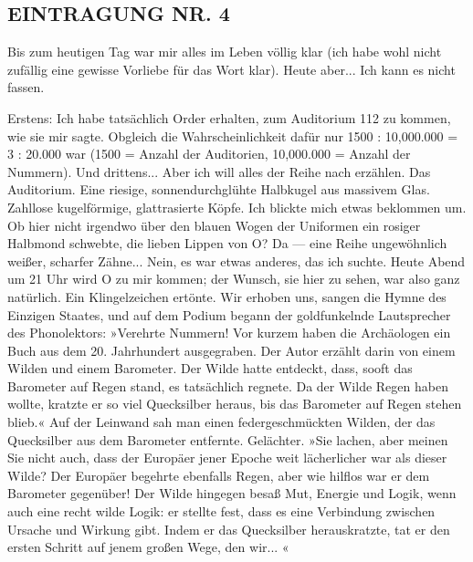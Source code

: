 \subsection{EINTRAGUNG NR. 4}

Bis zum heutigen Tag war mir alles im Leben völlig klar (ich habe
wohl nicht zufällig eine gewisse Vorliebe für das Wort klar). Heute
aber... Ich kann es nicht fassen.

Erstens: Ich habe tatsächlich Order erhalten, zum Auditorium 112 zu
kommen, wie sie mir sagte. Obgleich die Wahrscheinlichkeit dafür
nur 1500 : 10,000.000 = 3 : 20.000 war (1500 = Anzahl der
Auditorien, 10,000.000 = Anzahl der Nummern). Und drittens... Aber
ich will alles der Reihe nach erzählen. Das Auditorium. Eine
riesige, sonnendurchglühte Halbkugel aus massivem Glas. Zahllose
kugelförmige, glattrasierte Köpfe. Ich blickte mich etwas beklommen
um. Ob hier nicht irgendwo über den blauen Wogen der Uniformen ein
rosiger Halbmond schwebte, die lieben Lippen von O? Da — eine Reihe
ungewöhnlich weißer, scharfer Zähne... Nein, es war etwas anderes,
das ich suchte. Heute Abend um 21 Uhr wird O zu mir kommen; der
Wunsch, sie hier zu sehen, war also ganz natürlich. Ein
Klingelzeichen ertönte. Wir erhoben uns, sangen die Hymne des
Einzigen Staates, und auf dem Podium begann der goldfunkelnde
Lautsprecher des Phonolektors: »Verehrte Nummern! Vor kurzem haben
die Archäologen ein Buch aus dem 20. Jahrhundert ausgegraben. Der
Autor erzählt darin von einem Wilden und einem Barometer. Der Wilde
hatte entdeckt, dass, sooft das Barometer auf Regen stand, es
tatsächlich regnete. Da der Wilde Regen haben wollte, kratzte er so
viel Quecksilber heraus, bis das Barometer auf Regen stehen blieb.«
Auf der Leinwand sah man einen federgeschmückten Wilden, der das
Quecksilber aus dem Barometer entfernte. Gelächter. »Sie lachen,
aber meinen Sie nicht auch, dass der Europäer jener Epoche weit
lächerlicher war als dieser Wilde? Der Europäer begehrte ebenfalls
Regen, aber wie hilflos war er dem Barometer gegenüber! Der Wilde
hingegen besaß Mut, Energie und Logik, wenn auch eine recht wilde
Logik: er stellte fest, dass es eine Verbindung zwischen Ursache
und Wirkung gibt. Indem er das Quecksilber herauskratzte, tat er
den ersten Schritt auf jenem großen Wege, den wir... «


